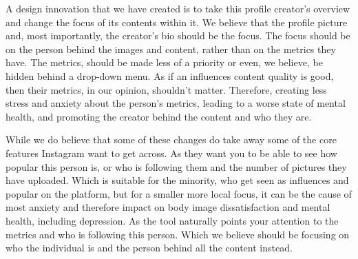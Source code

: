 \documentclass{sigchi}
\begin{document}
	A design innovation that we have created is to take this profile creator's overview and change the focus of its contents within it. We believe that the profile picture and, most importantly, the creator's bio should be the focus. The focus should be on the person behind the images and content, rather than on the metrics they have. The metrics, should be made less of a priority or even, we believe, be hidden behind a drop-down menu. As if an influences content quality is good, then their metrics, in our opinion, shouldn't matter. Therefore, creating less stress and anxiety about the person's metrics, leading to a worse state of mental health, and promoting the creator behind the content and who they are.
	
	While we do believe that some of these changes do take away some of the core features Instagram want to get across. As they want you to be able to see how popular this person is, or who is following them and the number of pictures they have uploaded. Which is suitable for the minority, who get seen as influences and popular on the platform, but for a smaller more local focus, it can be the cause of most anxiety and therefore impact on body image dissatisfaction and mental health, including depression. As the tool naturally points your attention to the metrics and who is following this person. Which we believe should be focusing on who the individual is and the person behind all the content instead.


\balance{}



\end{document}

